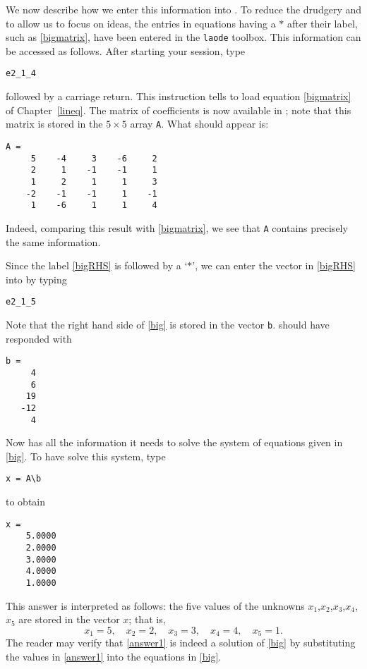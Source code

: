 \documentclass{ximera}
\begin{document}
We now describe how we enter this information into \Matlabp.  To
reduce the drudgery and to allow us to focus on ideas, the entries
in equations having a $*$ after their label,
such as \eqref{bigmatrix}, have been entered in the {\tt laode}
toolbox. This information can be accessed as follows.  After
starting your \Matlab session, type
\begin{verbatim}
e2_1_4
\end{verbatim}
followed by a carriage return.  This instruction tells \Matlab to
load equation \eqref{bigmatrix} of Chapter~\ref{lineq}.  The matrix of
coefficients is now available in \Matlabp; note that this matrix is
stored in the $5\times 5$ array {\tt A}.  What should appear is:
\begin{verbatim}
A =
     5    -4     3    -6     2
     2     1    -1    -1     1
     1     2     1     1     3
    -2    -1    -1     1    -1
     1    -6     1     1     4
\end{verbatim}
Indeed, comparing this result with \eqref{bigmatrix}, we see that
{\tt A} contains precisely the same information.

Since the label \eqref{bigRHS} is followed by a `$*$', we can enter
the vector in \eqref{bigRHS} into \Matlab by typing
\begin{verbatim}
e2_1_5
\end{verbatim}
Note that the right hand side of \eqref{big} is stored in the vector {\tt b}.
\Matlab should have responded with
\begin{verbatim}
b =
     4
     6
    19
   -12
     4
\end{verbatim}
Now \Matlab has all the information it needs to solve the system
of equations given in \eqref{big}.  To have \Matlab solve this
system, type
\begin{verbatim}
x = A\b
\end{verbatim}
\index{\computer!$\backslash$}to obtain
\begin{verbatim}
x =
    5.0000
    2.0000
    3.0000
    4.0000
    1.0000
\end{verbatim}
This answer is interpreted as follows: the five values of the
unknowns $x_1$,$x_2$,$x_3$,$x_4$,$x_5$ are stored in the vector
$x$; that is,
\begin{equation} \label{answer1}
 x_1 = 5,\quad x_2 = 2,\quad x_3 = 3,\quad x_4 = 4,\quad x_5 = 1.
\end{equation}
The reader may verify that \eqref{answer1} is indeed a solution of
\eqref{big} by substituting the values in \eqref{answer1} into the
equations in \eqref{big}.
\end{document}
